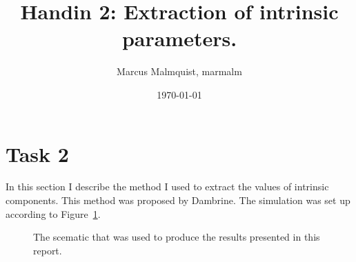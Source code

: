 \documentclass[12pt,a4paper]{article}
\title{Handin 2: Extraction of intrinsic parameters.}
\author{Marcus Malmquist, marmalm}
\date{\today}
\begin{document}
\maketitle

\section{Task 2}\label{sec:1}
In this section I describe the method I used to extract the values of intrinsic components. This method was proposed by Dambrine.
The simulation was set up according to Figure~\ref{fig:scematic}.
\begin{figure}
  \centering
  \noindent{}
  \caption{The scematic that was used to produce the results presented in this report.}
  \label{fig:scematic}
\end{figure}
\end{document}
